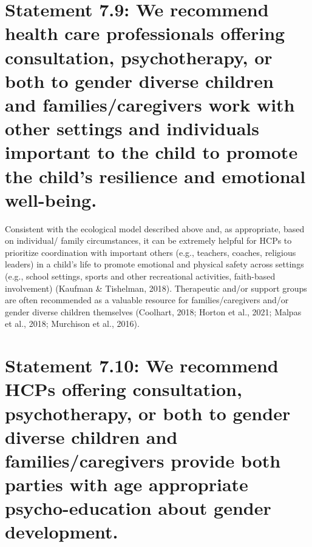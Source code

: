 \documentclass[
]{book}
\begin{document}
\hypertarget{statement-7.9-we-recommend-health-care-professionals-offering-consultation-psychotherapy-or-both-to-gender-diverse-children-and-familiescaregivers-work-with-other-settings-and-individuals-important-to-the-child-to-promote-the-childs-resilience-and-emotional-well-being.}{%
\section*{Statement 7.9: We recommend health care professionals offering consultation, psychotherapy, or both to gender diverse children and families/caregivers work with other settings and individuals important to the child to promote the child's resilience and emotional well-being.}\label{statement-7.9-we-recommend-health-care-professionals-offering-consultation-psychotherapy-or-both-to-gender-diverse-children-and-familiescaregivers-work-with-other-settings-and-individuals-important-to-the-child-to-promote-the-childs-resilience-and-emotional-well-being.}}

Consistent with the ecological model described
above and, as appropriate, based on individual/
family circumstances, it can be extremely helpful
for HCPs to prioritize coordination with important others (e.g., teachers, coaches, religious leaders) in a child's life to promote emotional and
physical safety across settings (e.g., school settings, sports and other recreational activities,
faith-based involvement) (Kaufman \& Tishelman,
2018). Therapeutic and/or support groups are
often recommended as a valuable resource for
families/caregivers and/or gender diverse children
themselves (Coolhart, 2018; Horton et al., 2021;
Malpas et al., 2018; Murchison et al., 2016).

\hypertarget{statement-7.10-we-recommend-hcps-offering-consultation-psychotherapy-or-both-to-gender-diverse-children-and-familiescaregivers-provide-both-parties-with-age-appropriate-psycho-education-about-gender-development.}{%
\section*{Statement 7.10: We recommend HCPs offering consultation, psychotherapy, or both to gender diverse children and families/caregivers provide both parties with age appropriate psycho-education about gender development.}\label{statement-7.10-we-recommend-hcps-offering-consultation-psychotherapy-or-both-to-gender-diverse-children-and-familiescaregivers-provide-both-parties-with-age-appropriate-psycho-education-about-gender-development.}}
\end{document}
